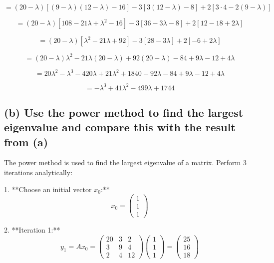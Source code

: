 \documentclass{article}
\begin{document}
\[ = (20 - \lambda) [(9 - \lambda)(12 - \lambda) - 16] - 3 [3(12 - \lambda) - 8] + 2 [3 \cdot 4 - 2(9 - \lambda)] \]

\[ = (20 - \lambda) [108 - 21\lambda + \lambda^2 - 16] - 3 [36 - 3\lambda - 8] + 2 [12 - 18 + 2\lambda] \]

\[ = (20 - \lambda) [\lambda^2 - 21\lambda + 92] - 3 [28 - 3\lambda] + 2 [-6 + 2\lambda] \]

\[ = (20 - \lambda) \lambda^2 - 21\lambda(20 - \lambda) + 92(20 - \lambda) - 84 + 9\lambda - 12 + 4\lambda \]

\[ = 20\lambda^2 - \lambda^3 - 420\lambda + 21\lambda^2 + 1840 - 92\lambda - 84 + 9\lambda - 12 + 4\lambda \]

\[ = -\lambda^3 + 41\lambda^2 - 499\lambda + 1744 \]







\subsection*{(b) Use the power method to find the largest eigenvalue and compare this with the result from (a)}

The power method is used to find the largest eigenvalue of a matrix. Perform 3 iterations analytically:

1. **Choose an initial vector \( x_0 \):**
\[ x_0 = \begin{pmatrix} 1 \\ 1 \\ 1 \end{pmatrix} \]

2. **Iteration 1:**
\[ y_1 = Ax_0 = \begin{pmatrix} 20 & 3 & 2 \\ 3 & 9 & 4 \\ 2 & 4 & 12 \end{pmatrix} \begin{pmatrix} 1 \\ 1 \\ 1 \end{pmatrix} = \begin{pmatrix} 25 \\ 16 \\ 18 \end{pmatrix} \]
\end{document}
